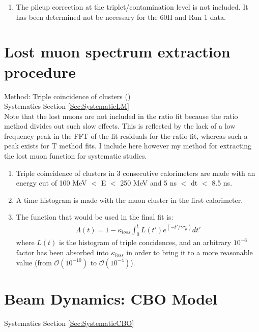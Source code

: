 \begin{enumerate}
		\item{The pileup correction at the triplet/contamination level is not included. It has been determined not be necessary for the 60H and Run 1 data.}
	\end{enumerate}


\section{Lost muon spectrum extraction procedure}
\label{Sec:LM}

	Method: Triple coincidence of clusters () \\
	\noindent Systematics Section \ref{Sec:SystematicLM} \\

	Note that the lost muons are not included in the ratio fit because the ratio method divides out such slow effects. This is reflected by the lack of a low frequency peak in the FFT of the fit residuals for the ratio fit, whereas such a peak exists for T method fits. I include here however my method for extracting the lost muon function for systematic studies.

	\begin{enumerate}
		\item{Triple coincidence of clusters in 3 consecutive calorimeters are made with an energy cut of 100 MeV $<$ E $<$ 250 MeV and 5 ns $<$ dt $<$ 8.5 ns.}
		\item{A time histogram is made with the muon cluster in the first calorimeter.}
		\item{The function that would be used in the final fit is:
			\begin{gather}
				\Lambda(t) = 1 - \kappa_{loss} \int_{0}^{t} L(t')e^{(-t'/\gamma\tau_{\mu})} dt'
			\end{gather}
		where $L(t)$ is the histogram of triple concidences, and an arbitrary $10^{-6}$ factor has been absorbed into $\kappa_{loss}$ in order to bring it to a more reasonable value (from $\mathcal{O}(10^{-10})$ to $\mathcal{O}(10^{-4})$).}
	\end{enumerate}


\section{Beam Dynamics: CBO Model}
\label{Sec:CBO}

	\noindent Systematics Section \ref{Sec:SystematicCBO}

